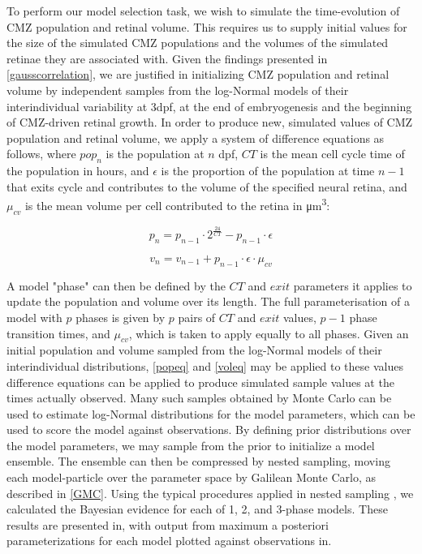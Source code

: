 To perform our model selection task, we wish to simulate the time-evolution of CMZ population and retinal volume. This requires us to supply initial values for the size of the simulated CMZ populations and the volumes of the simulated retinae they are associated with. Given the findings presented in \autoref{gausscorrelation}, we are justified in initializing CMZ population and retinal volume by independent samples from the log-Normal models of their interindividual variability at 3dpf, at the end of embryogenesis and the beginning of CMZ-driven retinal growth. In order to produce new, simulated values of CMZ population and retinal volume, we apply a system of difference equations as follows, where $pop_n$ is the population at $n$ dpf, $CT$ is the mean cell cycle time of the population in hours, and $\epsilon$ is the proportion of the population at time $n-1$ that exits cycle and contributes to the volume of the specified neural retina, and $\mu_{cv}$ is the mean volume per cell contributed to the retina in \si{\cubic\micro\metre}:

\begin{equation}
    p_n=p_{n-1} \cdot 2^{\frac{24}{CT}} - p_{n-1} \cdot \epsilon
    \label{popeq}
\end{equation}

\begin{equation}
    v_n=v_{n-1} + p_{n-1} \cdot \epsilon \cdot \mu_{cv}
    \label{voleq}
\end{equation}

A model "phase" can then be defined by the $CT$ and $exit$ parameters it applies to update the population and volume over its length. The full parameterisation of a model with $p$ phases is given by $p$ pairs of $CT$ and $exit$ values, $p-1$ phase transition times, and $\mu_{cv}$, which is taken to apply equally to all phases. Given an initial population and volume sampled from the log-Normal models of their interindividual distributions, \autoref{popeq} and \autoref{voleq} may be applied to these values difference equations can be applied to produce simulated sample values at the times actually observed. Many such samples obtained by Monte Carlo can be used to estimate log-Normal distributions for the model parameters, which can be used to score the model against observations. By defining prior distributions over the model parameters, we may sample from the prior to initialize a model ensemble. The ensemble can then be compressed by nested sampling, moving each model-particle over the parameter space by Galilean Monte Carlo, as described in \autoref{GMC}. Using the typical procedures applied in nested sampling \cite{Skilling2006}, we calculated the Bayesian evidence for each of 1, 2, and 3-phase models. These results are presented in, with output from maximum a posteriori parameterizations for each model plotted against observations in.

